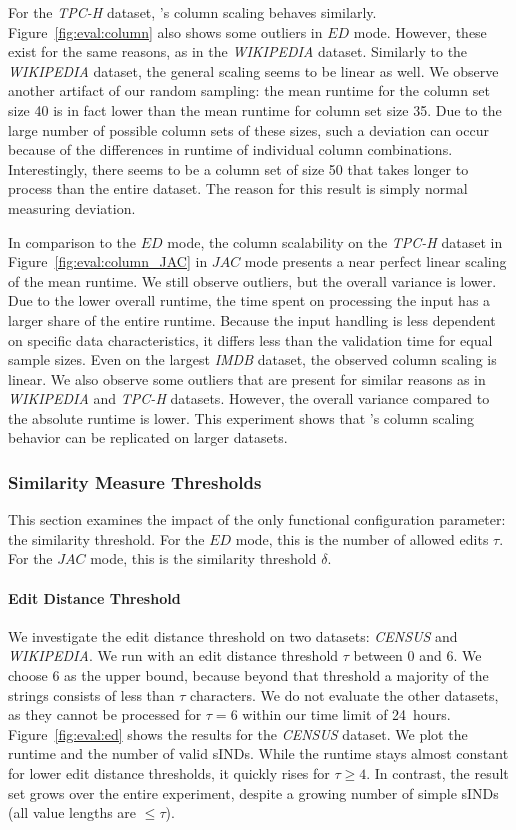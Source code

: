 For the \emph{TPC-H} dataset, \sawfish's column scaling behaves similarly.
Figure~\ref{fig:eval:column} also shows some outliers in $ED$ mode.
However, these exist for the same reasons, as in the \emph{WIKIPEDIA} dataset.
Similarly to the \emph{WIKIPEDIA} dataset, the general scaling seems to be linear as well.
We observe another artifact of our random sampling: the mean runtime for the column set size 40 is in fact lower than the mean runtime for column set size 35.
Due to the large number of possible column sets of these sizes, such a deviation can occur because of the differences in runtime of individual column combinations.
Interestingly, there seems to be a column set of size 50 that takes longer to process than the entire dataset.
The reason for this result is simply normal measuring deviation.

In comparison to the $ED$ mode, the column scalability on the \emph{TPC-H} dataset in Figure~\ref{fig:eval:column_JAC} in $JAC$ mode presents a near perfect linear scaling of the mean runtime.
We still observe outliers, but the overall variance is lower.
Due to the lower overall runtime, the time spent on processing the input has a larger share of the entire runtime.
Because the input handling is less dependent on specific data characteristics, it differs less than the validation time for equal sample sizes.
Even on the largest \emph{IMDB} dataset, the observed column scaling is linear.
We also observe some outliers that are present for similar reasons as in \emph{WIKIPEDIA} and \emph{TPC-H} datasets.
However, the overall variance compared to the absolute runtime is lower.
This experiment shows that \sawfish's column scaling behavior can be replicated on larger datasets.

\subsubsection{Similarity Measure Thresholds}
\label{subsection:similarity_measure_scalability}
This section examines the impact of the only functional configuration parameter: the similarity threshold.
For the $ED$ mode, this is the number of allowed edits $\tau$.
For the $JAC$ mode, this is the similarity threshold $\delta$.

\paragraph{Edit Distance Threshold}
We investigate the edit distance threshold on two datasets:  \emph{CENSUS} and \emph{WIKIPEDIA}.
We run \sawfish with an edit distance threshold $\tau$ between $0$ and $6$.
We choose 6 as the upper bound, because beyond that threshold a majority of the strings consists of less than $\tau$ characters.
We do not evaluate the other datasets, as they cannot be processed for $\tau = 6$ within our time limit of 24~hours.
Figure~\ref{fig:eval:ed} shows the results for the \emph{CENSUS} dataset.
We plot the runtime and the number of valid sINDs.
While the runtime stays almost constant for lower edit distance thresholds, it quickly rises for $\tau \geq 4$.
In contrast, the result set grows over the entire experiment, despite a growing number of simple sINDs (all value lengths are $\leq \tau$).

